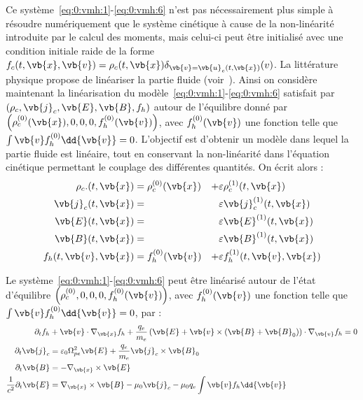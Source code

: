 Ce système~\eqref{eq:0:vmh:1}-\eqref{eq:0:vmh:6} n'est pas nécessairement plus simple à résoudre numériquement que le système cinétique à cause de la non-linéarité introduite par le calcul des moments, mais celui-ci peut être initialisé avec une condition initiale raide de la forme $f_c(t,\vb{x},\vb{v}) = \rho_c(t,\vb{x})\delta_{\vb{v}=\vb{u}_c(t,\vb{x})}(v)$. La littérature physique propose de linéariser la partie fluide (voir~\cite{Holderied:2019}). Ainsi on considère maintenant la linéarisation du modèle~\eqref{eq:0:vmh:1}-\eqref{eq:0:vmh:6} satisfait par $(\rho_c,\vb{j}_c,\vb{E},\vb{B},f_h)$ autour de l'équilibre donné par $\left(\rho_c^{(0)}(\vb{x}),0,0,0,f_h^{(0)}(\vb{v})\right)$, avec $f_h^{(0)}(\vb{v})$ une fonction telle que $\int\vb{v}f_h^{(0)}\dd{\vb{v}} = 0$. L'objectif est d'obtenir un modèle dans lequel la partie fluide est linéaire, tout en conservant la non-linéarité dans l'équation cinétique permettant le couplage des différentes quantités. On écrit alors :
\begin{equation}
  \begin{aligned}
    \rho_c. (t,\vb{x}) &= \rho_c^{(0)}(\vb{x}) & + & \varepsilon\rho_c^{(1)}(t,\vb{x}) \\
    \vb{j}_c(t,\vb{x}) &=                      &   & \varepsilon\vb{j}_c^{(1)}(t,\vb{x}) \\
    \vb{E}  (t,\vb{x}) &=                      &   & \varepsilon\vb{E}^{(1)}(t,\vb{x}) \\
    \vb{B}  (t,\vb{x}) &=                      &   & \varepsilon\vb{B}^{(1)}(t,\vb{x}) \\
    f_h(t,\vb{v},\vb{x}) &= f_h^{(0)}(\vb{v})  & + & \varepsilon f_h^{(1)}(t,\vb{v},\vb{x})
  \end{aligned}
  \label{eq:0:linear}
\end{equation}

\begin{pro}
  \label{pro:0:vmhl}
  Le système~\eqref{eq:0:vmh:1}-\eqref{eq:0:vmh:6} peut être linéarisé autour de l'état d'équilibre $\left(\rho_c^{(0)},0,0,0,f_h^{(0)}(\vb{v})\right)$, avec $f_h^{(0)}(\vb{v})$ une fonction telle que $\int\vb{v}f_h^{(0)}\dd{\vb{v}} = 0$, par :
  \begin{align}
    \label{eq:0:vmhl:1}
      \partial_t f_h &+ \vb{v}\cdot\nabla_{\vb{x}} f_h + \frac{q_e}{m_e}\left( \vb{E} + \vb{v}\times(\vb{B}+\vb{B}_0) \right)\cdot\nabla_{\vb{v}} f_h = 0 \\
    \label{eq:0:vmhl:2}
      \partial_t\vb{j}_c &= \varepsilon_0\Omega_{pe}^2\vb{E} + \frac{q_e}{m_e}\vb{j}_c\times\vb{B}_0 \\
    \label{eq:0:vmhl:3}
      \partial_t\vb{B} &= -\nabla_{\vb{x}}\times\vb{E} \\
    \label{eq:0:vmhl:4}
      \frac{1}{c^2}\partial_t\vb{E} &= \nabla_{\vb{x}}\times\vb{B} - \mu_0\vb{j}_c - \mu_0q_e\int\vb{v}f_h\dd{\vb{v}}
  \end{align}
\end{pro}

